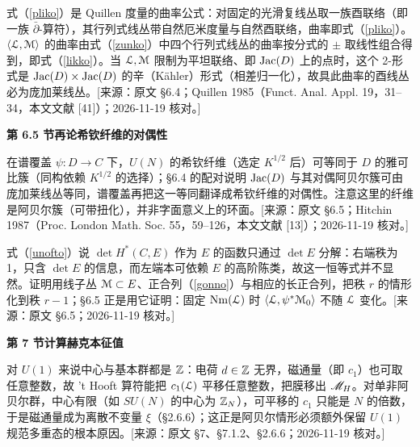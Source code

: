 \begin{description}[leftmargin=5.8em,labelwidth=5em,labelsep=0.6em,itemsep=0.15ex,topsep=0.2ex]
\item[6.4-1] 式（\ref{pliko}）是 Quillen 度量的曲率公式：对固定的光滑复线丛取一族酉联络（即一族 $\bar\partial$-算符），其行列式线丛带自然厄米度量与自然酉联络，曲率即式（\ref{pliko}）。$\langle{\cal L},{\cal M}\rangle$ 的曲率由式（\ref{zunko}）中四个行列式线丛的曲率按分式的 $\pm$ 取线性组合得到，即式（\ref{likko}）。当 ${\cal L},{\cal M}$ 限制为平坦联络、即 ${\rm Jac}(D)$ 上的点时，这个 2-形式是 ${\rm Jac}(D)\times{\rm Jac}(D)$ 的辛（Kähler）形式（相差归一化），故具此曲率的酉线丛必为庞加莱线丛。[来源：原文 §6.4；Quillen 1985（Funct. Anal. Appl. 19，31–34，本文文献 [41]）；2026-11-19 核对。]
\end{description}
\medskip\noindent\textbf{第 6.5 节\quad 再论希钦纤维的对偶性}\par\nopagebreak
\begin{description}[leftmargin=5.8em,labelwidth=5em,labelsep=0.6em,itemsep=0.15ex,topsep=0.2ex]
\item[6.5-1] 在谱覆盖 $\psi:D\to C$ 下，$U(N)$ 的希钦纤维（选定 $K^{1/2}$ 后）可等同于 $D$ 的雅可比簇（同构依赖 $K^{1/2}$ 的选择）；§6.4 的配对说明 ${\rm Jac}(D)$ 与其对偶阿贝尔簇可由庞加莱线丛等同，谱覆盖再把这一等同翻译成希钦纤维的对偶性。注意这里的纤维是阿贝尔簇（可带扭化），并非字面意义上的环面。[来源：原文 §6.5；Hitchin 1987（Proc. London Math. Soc. 55，59–126，本文文献 [13]）；2026-11-19 核对。]
\item[6.5-2] 式（\ref{unofto}）说 $\det H^*(C,E)$ 作为 $E$ 的函数只通过 $\det E$ 分解：右端秩为 1，只含 $\det E$ 的信息，而左端本可依赖 $E$ 的高阶陈类，故这一恒等式并不显然。证明用线子丛 ${\cal M}\subset E$、正合列（\ref{gonno}）与相应的长正合列，把秩 $r$ 的情形化到秩 $r-1$；§6.5 正是用它证明：固定 ${\rm Nm}({\cal L})$ 时 $\langle{\cal L},\psi^*{\cal M}_0\rangle$ 不随 ${\cal L}$ 变化。[来源：原文 §6.5；2026-11-19 核对。]
\end{description}
\medskip\noindent\textbf{第 7 节\quad 计算赫克本征值}\par\nopagebreak
\begin{description}[leftmargin=5.8em,labelwidth=5em,labelsep=0.6em,itemsep=0.15ex,topsep=0.2ex]
\item[7-1] 对 $U(1)$ 来说中心与基本群都是 ${\mathbb Z}$：电荷 $d\in{\mathbb Z}$ 无界，磁通量（即 $c_1$）也可取任意整数，故 't Hooft 算符能把 $c_1({\cal L})$ 平移任意整数，把膜移出 ${{\mathscr{M}}_H}$。对单非阿贝尔群，中心有限（如 $SU(N)$ 的中心为 ${\mathbb Z}_N$），可平移的 $c_1$ 只能是 $N$ 的倍数，于是磁通量成为离散不变量 $\xi$（§2.6.6）；这正是阿贝尔情形必须额外保留 $U(1)$ 规范多重态的根本原因。[来源：原文 §7、§7.1.2、§2.6.6；2026-11-19 核对。]
\end{description}
